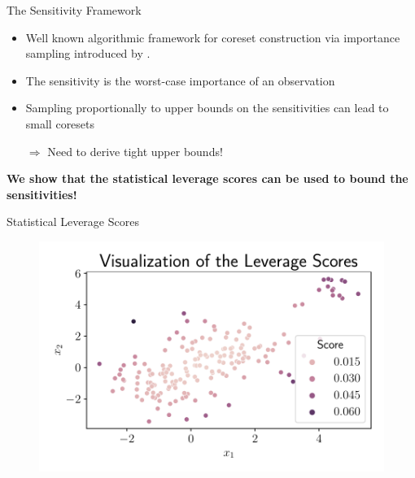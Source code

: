 \documentclass[gray]{beamer}
\begin{document}
\begin{frame}{The Sensitivity Framework}\pause

    \begin{itemize}
        \item Well known algorithmic framework for coreset construction via
              importance sampling introduced by \cite{feldman-langberg-coresets}.
        \item The sensitivity is the worst-case importance of an observation
        \item Sampling proportionally to upper bounds on the sensitivities
              can lead to small coresets
        \item[$\Rightarrow$] Need to derive tight upper bounds!
    \end{itemize}

    \pause

    \vspace{\fill}

    \textbf{We show that the statistical leverage scores can be
        used to bound the sensitivities!}

\end{frame}

\begin{frame}{Statistical Leverage Scores}
    \begin{figure}[ht!]
        \centering
        \includegraphics[width=\linewidth]{../figures/leverage_scores_visualization.pdf}
    \end{figure}
\end{frame}
\end{document}
